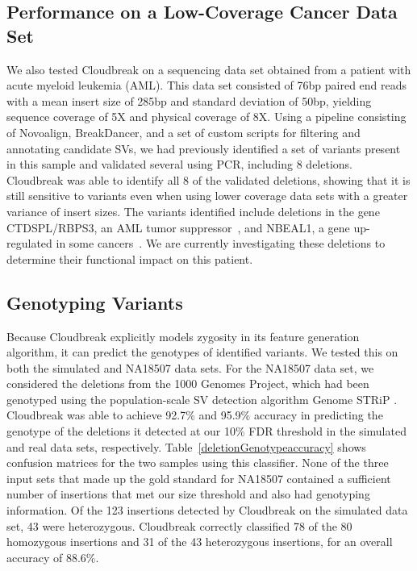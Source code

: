 \documentclass [11pt] {report}
\begin{document}
\subsection{Performance on a Low-Coverage Cancer Data Set}

We also tested Cloudbreak on a sequencing data set obtained from a patient with acute myeloid leukemia (AML). This data set consisted of 76bp paired end reads with a mean insert size of 285bp and standard deviation of 50bp, yielding sequence coverage of 5X and physical coverage of 8X. Using a pipeline consisting of Novoalign, BreakDancer, and a set of custom scripts for filtering and annotating candidate SVs, we had previously identified a set of variants present in this sample and validated several using PCR, including 8 deletions. Cloudbreak was able to identify all 8 of the validated deletions, showing that it is still sensitive to variants even when using lower coverage data sets with a greater variance of insert sizes. The variants identified include deletions in the gene CTDSPL/RBPS3, an AML tumor suppressor~\cite{Zheng:2012kk}, and NBEAL1, a gene up-regulated in some cancers~\cite{Chen:2004jo}. We are currently investigating these deletions to determine their functional impact on this patient. 

\subsection{Genotyping Variants}

Because Cloudbreak explicitly models zygosity in its feature generation algorithm, it can predict the genotypes of identified variants. We tested this on both the simulated and NA18507 data sets. For the NA18507 data set, we considered the deletions from the 1000 Genomes Project, which had been genotyped using the population-scale SV detection algorithm Genome STRiP \cite{Handsaker:2011ki}. Cloudbreak was able to achieve 92.7\% and 95.9\% accuracy in predicting the genotype of the deletions it detected at our 10\% FDR threshold in the simulated and real data sets, respectively. Table~\ref{deletionGenotypeaccuracy} shows confusion matrices for the two samples using this classifier. None of the three input sets that made up the gold standard for NA18507 contained a sufficient number of insertions that met our size threshold and also had genotyping information. Of the 123 insertions detected by Cloudbreak on the simulated data set, 43 were heterozygous. Cloudbreak correctly classified 78 of the 80 homozygous insertions and 31 of the 43 heterozygous insertions, for an overall accuracy of 88.6\%.
\end{document}
